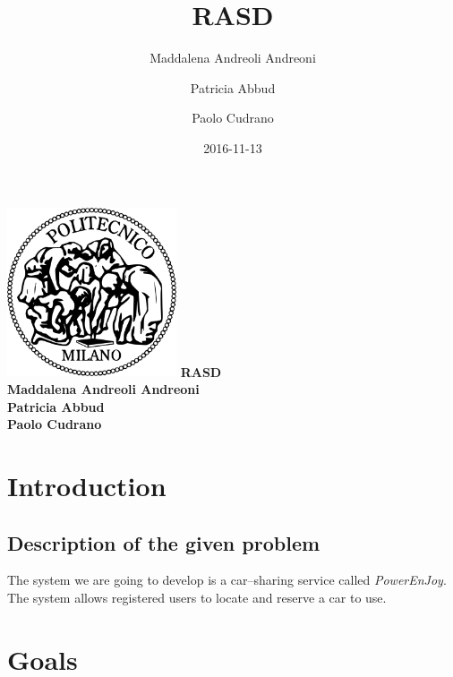 \documentclass{article}
\title{RASD}
\date{2016-11-13}
\author{
	Maddalena Andreoli Andreoni
	\and
	Patricia Abbud
	\and
	Paolo Cudrano
}
\begin{document}
	\begin{titlepage}
	    \centering
	    \includegraphics[width=5cm]{img/polimi_logo.png} %
	    \vfill
	    {\bfseries\Large
	        RASD\\
	        \vskip4cm
	        Maddalena Andreoli Andreoni\\
					Patricia Abbud\\
	        Paolo Cudrano\\
	    }    
	    \vfill
	    \vfill
	\end{titlepage}

	\tableofcontents
	\newpage	
  
  \section{Introduction}
		\subsection{Description of the given problem}

The system we are going to develop is a car–sharing service called \textit{PowerEnJoy}. The system allows registered users to locate and reserve a car to use.

	\section{Goals}
	
		
	
\end{document}
